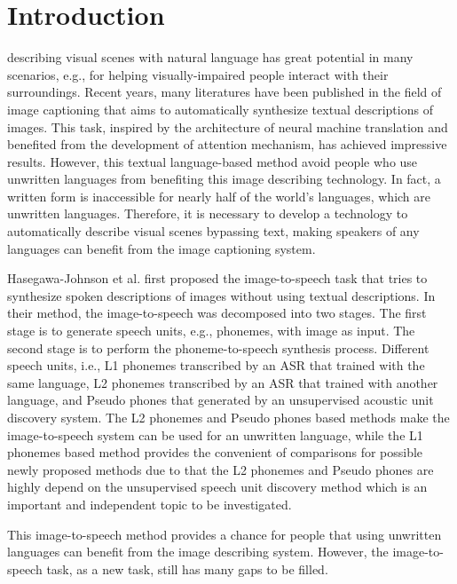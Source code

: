 \documentclass[journal,comsoc]{IEEEtran}
\begin{document}
\section{Introduction}
\label{sc:Introduction}
 describing visual scenes with natural language has great potential in many scenarios, e.g., for helping visually-impaired people interact with their surroundings. Recent years, many literatures \cite{xu2015show,chen2018boosted,li2019entangled,huang2019attention,cornia2020meshed,rennie2017self,chen2017show,keneshloo2019deep} have been published in the field of image captioning that aims to automatically synthesize textual descriptions of images. This task, inspired by the architecture of neural machine translation and benefited from the development of attention mechanism, has achieved impressive results. However, this textual language-based method avoid people who use unwritten languages from benefiting this image describing technology. In fact, a written form is inaccessible for nearly half of the world's languages, which are unwritten languages. Therefore, it is necessary to develop a technology to automatically describe visual scenes bypassing text, making speakers of any languages can benefit from the image captioning system.

Hasegawa-Johnson et al. \cite{hasegawa2017image2speech} first proposed the image-to-speech task that tries to synthesize spoken descriptions of images without using textual descriptions. In their method, the image-to-speech was decomposed into two stages. The first stage is to generate speech units, e.g., phonemes, with image as input. The second stage is to perform the phoneme-to-speech synthesis process. Different speech units, i.e., L1 phonemes transcribed by an ASR that trained with the same language, L2 phonemes transcribed by an ASR that trained with another language, and Pseudo phones that generated by an unsupervised acoustic unit discovery system. The L2 phonemes and Pseudo phones based methods make the image-to-speech system can be used for an unwritten language, while the L1 phonemes based method provides the convenient of comparisons for possible newly proposed methods due to that the L2 phonemes and Pseudo phones are highly depend on the unsupervised speech unit discovery method which is an important and independent topic to be investigated. 

This image-to-speech method \cite{hasegawa2017image2speech} provides a chance for people that using unwritten languages can benefit from the image describing system. However, the image-to-speech task, as a new task, still has many gaps to be filled. 
\end{document}
